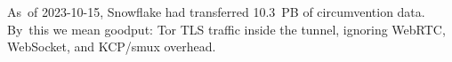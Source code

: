 \documentclass[letterpaper,twocolumn]{article}
\begin{document}
As~of \mbox{2023-10-15},
Snowflake had transferred 10.3~PB of circumvention data.
By~this we mean goodput: Tor TLS traffic inside the tunnel,
ignoring WebRTC, WebSocket, and KCP/\allowbreak smux overhead.
\end{document}
